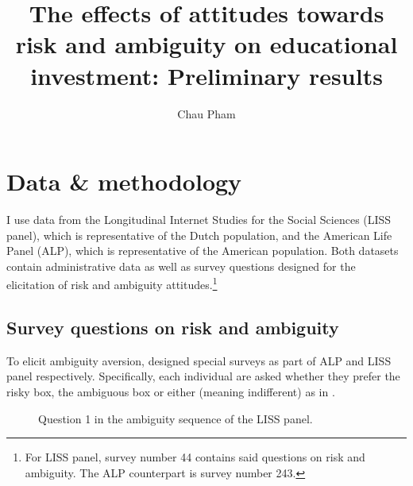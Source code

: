 \documentclass[]{article}
\title{The effects of attitudes towards risk and ambiguity on educational investment: Preliminary results}
\author{Chau Pham}
\begin{document}
\maketitle
\onehalfspacing

\section{Data \& methodology}
I use data from the Longitudinal Internet Studies for the Social Sciences (LISS panel), which is representative of the Dutch population, and the American Life Panel (ALP), which is representative of the American population. Both datasets contain administrative data as well as survey questions designed for the elicitation of risk and ambiguity attitudes.\footnote{For LISS panel, survey number 44 contains said questions on risk and ambiguity. The ALP counterpart is survey number 243.}

\subsection{Survey questions on risk and ambiguity}
To elicit ambiguity aversion, \citet{DIMMOCK2016559, dimmock2016ambiguity} designed special surveys as part of ALP and LISS panel respectively. Specifically, each individual are asked whether they prefer the risky box, the ambiguous box or either (meaning indifferent) as in .

\begin{figure}[!ht]
	\setlength{\fboxrule}{1.5pt}
	\setlength{\fboxsep}{0pt}
	\caption{Question 1 in the ambiguity sequence of the LISS panel.}
	\label{fig:1}
\end{figure}
\end{document}
